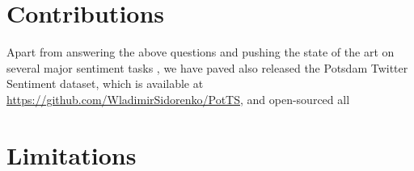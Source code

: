 \section*{Contributions}

Apart from answering the above questions and pushing the state of the
art on several major sentiment tasks , we have paved also released the
Potsdam Twitter Sentiment dataset, which is available at
\url{https://github.com/WladimirSidorenko/PotTS}, and open-sourced all

\section*{Limitations}
